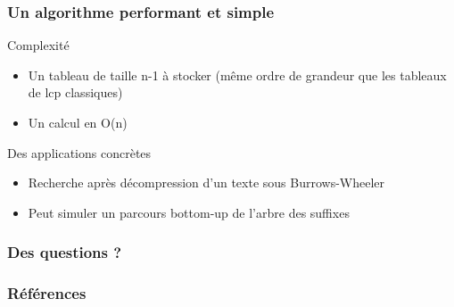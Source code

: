 \documentclass[10pt]{beamer}
\begin{document}
\begin{frame}
  \frametitle{Un algorithme performant et simple}

  \begin{block}{Complexité}
    \begin{itemize}
    \item Un tableau de taille n-1 à stocker (même ordre de grandeur que les
      tableaux de lcp classiques)
    \item Un calcul en O(n)
    \end{itemize}
  \end{block}

  \begin{block}{Des applications concrètes}
    \begin{itemize}
    \item Recherche après décompression d'un texte sous Burrows-Wheeler
    \item Peut simuler un parcours bottom-up de l'arbre des suffixes
    \end{itemize}
  \end{block}

\end{frame}

\begin{frame}
  \frametitle{Des questions ?}



\end{frame}

\begin{frame}
  \frametitle{Références}
  
  
\end{frame}
\end{document}
